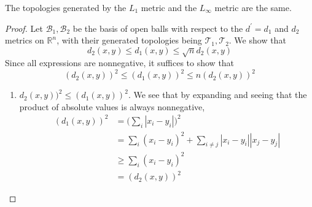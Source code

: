 \documentclass{article}
\begin{document}
      \begin{theorem} 
        The topologies generated by the $L_1$ metric and the $L_\infty$ metric are the same. 
      \end{theorem} 
      \begin{proof}
        Let $\mathscr{B}_1, \mathscr{B}_2$ be the basis of open balls with respect to the $d^\prime = d_1$ and $d_2$ metrics on $\mathbb{R}^n$, with their generated topologies being $\mathscr{T}_1, \mathscr{T}_2$. We show that 
        \begin{equation}
          d_2 (x, y) \leq d_1 (x, y) \leq \sqrt{n} d_2 (x, y)
        \end{equation} 
        Since all expressions are nonnegative, it suffices to show that 
        \begin{equation}
          (d_2 (x, y))^2 \leq (d_1 (x, y))^2 \leq n (d_2 (x, y))^2
        \end{equation} 
        \begin{enumerate}
          \item $d_2 (x, y))^2 \leq (d_1 (x, y))^2$. We see that by expanding and seeing that the product of absolute values is always nonnegative, 
          \begin{align}
            (d_1 (x, y))^2 & = \bigg( \sum_i |x_i - y_i| \bigg)^2 \\
                           & = \sum_i (x_i - y_i)^2 + \sum_{i \neq j} |x_i - y_i| |x_j - y_j| \\ 
                           & \geq \sum_i (x_i - y_i)^2 \\
                           & = (d_2 (x, y))^2
          \end{align}


\end{enumerate}
\end{proof}
\end{document}
